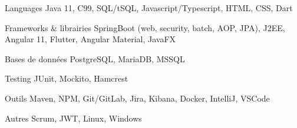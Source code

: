 


\begin{cvskills}


\cvskill
{Languages} %
{Java 11, C99, SQL/tSQL, Javascript/Typescript, HTML, CSS, Dart} %


\cvskill
{Frameworks \& librairies} %
{SpringBoot (web, security, batch, AOP, JPA), J2EE, Angular 11, Flutter, Angular Material, JavaFX} %


\cvskill
{Bases de données} %
{PostgreSQL, MariaDB, MSSQL} %

\cvskill
{Testing} %
{JUnit, Mockito, Hamcrest} %

\cvskill
{Outils} %
{Maven, NPM, Git/GitLab, Jira, Kibana, Docker, IntelliJ, VSCode} %


\cvskill
{Autres} %
{Scrum, JWT, Linux, Windows} %

\end{cvskills}
